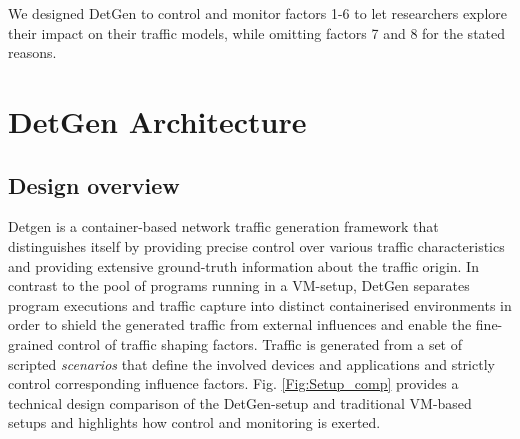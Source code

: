 \documentclass[runningheads]{llncs}
\begin{document}



\vspace{0.3cm}
We designed DetGen to control and monitor factors 1-6 to let researchers explore their impact on their traffic models, while omitting factors 7 and 8 for the stated reasons.

\section{DetGen Architecture}\label{Sec:Archi}



\subsection{Design overview}

Detgen is a container-based network traffic generation framework that distinguishes itself by providing precise control over various traffic characteristics and providing extensive ground-truth information about the traffic origin. %
In contrast to the pool of programs running in a VM-setup, DetGen separates program executions and traffic capture into distinct containerised environments in order to shield the generated traffic from external influences and enable the fine-grained control of traffic shaping factors.
Traffic is generated from a set of scripted \textit{scenarios} that define the involved devices and applications and strictly control corresponding influence factors. 
Fig. \ref{Fig:Setup_comp} provides a technical design comparison of the DetGen-setup and traditional VM-based setups and highlights how control and monitoring is exerted.
\end{document}
